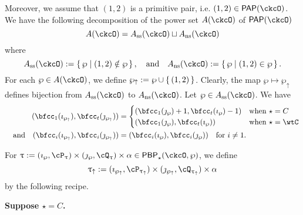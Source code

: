 \documentclass[12pt,a4paper]{amsart}
\def\Ass{A_{\mathrm{ss}}}
\def\Ans{A_{\mathrm{ns}}}
\def\wpu{\wp_{\uparrow}}
\def\wpd{\wp} %
\def\uptauu{\uptau_{\uparrow}}
\def\PPm{\wp_{\downarrow}}
\numberwithin{equation}{section}
\theoremstyle{remark}
\def\PP{\mathsf{PAP}}
\def\AND{\quad \text{and} \quad}
\def\PBP{\mathsf{PBP}}
\def\PBPop#1#2#3#4{\PBP_{#1}^{#2}(#3,#4)}
\newcommand{\PBPOP}[1][]{\PBPop{\star}{#1}{\ckcO}{\wp}}
\begin{document}
 Moreover, we assume that $(1,2)$ is a primitive pair, i.e.
 $(1,2)\in \PP(\ckcO)$. We have the following decomposition of the power set
 $A(\ckcO)$ of $\PP(\ckcO)$
 \[
   A(\ckcO) = \Ass(\ckcO) \sqcup \Ans(\ckcO)
 \]
 where
 \[
 \Ass(\ckcO): = \set{\wp | (1,2)\notin \wp}, \AND
 \Ans(\ckcO): = \set{\wp | (1,2)\in \wp}.
 \]
 For each $\wp\in A(\ckcO)$, we
 define $\wp_{\uparrow}:= \wp\cup \set{(1,2)}$. Clearly, the map
 $\wp \mapsto \wp_{\uparrow}$ defines bijection from $\Ass(\ckcO)$ to
 $\Ans(\ckcO)$.
 Let $\wp\in \Ass(\ckcO)$. We have
  \[
    \begin{split}
      (\bfcc_{1}(\imath_{\wpu}), \bfcc_{t}(\jmath_{\wpu})) &=
      \begin{cases}
        (\bfcc_{1}(\jmath_{\wpd})+1, \bfcc_{t}(\imath_{\wpd})-1) & \text{when
        } \star = C\\
        (\bfcc_{1}(\jmath_{\wpd}), \bfcc_{t}(\imath_{\wpd}))& \text{when
        } \star = \wtC\\
      \end{cases}
      \\
      \AND
      (\bfcc_{i}(\imath_{\wpu}),\bfcc_{i}(\jmath_{\wpu})) &=(\bfcc_{i}(\imath_{\wpd}),\bfcc_{i}(\jmath_{\wpd}))\quad \text{for $i\neq 1$}.
    \end{split}
  \]

 For
 $\uptau := (\imath_{\wp},\cP_{\uptau})\times (\jmath_{\wp},\cQ_{\uptau})\times \alpha \in \PBPOP $,
 we
 define
 \[
   \uptauu:= (\imath_{\wpu}, \cP_{\uptauu})\times (\jmath_{\wpu},\cQ_{\uptauu})\times \alpha
 \]
 by the following recipe.

 {\bfseries Suppose $\star = C$.}

 \newcommand{\localtextbulletone}{\textcolor{black}{\raisebox{.45ex}{\rule{.6ex}{.6ex}}}}
\end{document}

